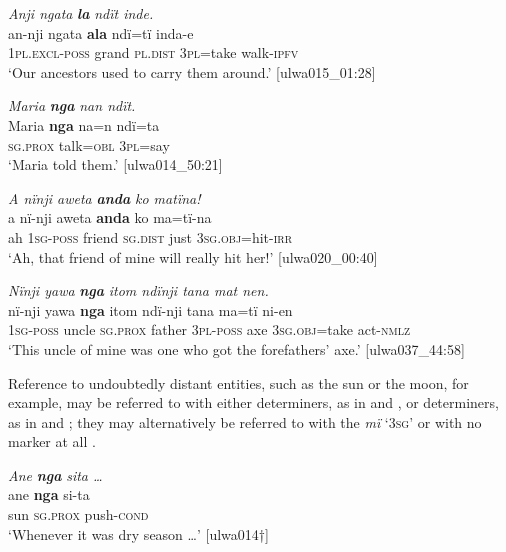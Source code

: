 \ea%
    \label{ex:det:114}
          \textit{Anji ngata} \textbf{\textit{la}} \textit{ndït inde.}\\
\gll    an-nji        ngata  \textbf{ala}      ndï=tï    inda-e\\
    1\textsc{pl.excl-poss}  grand  \textsc{pl.dist}  3\textsc{pl}=take  walk-\textsc{ipfv}\\
\glt `Our ancestors used to carry them around.’ [ulwa015\_01:28]
\z


\ea%
    \label{ex:det:116}
          \textit{Maria} \textbf{\textit{nga}} \textit{nan ndït.}\\
\gll    Maria  \textbf{nga}    na=n    ndï=ta\\
    [name]  \textsc{sg.prox}  talk=\textsc{obl}  3\textsc{pl}=say\\
\glt `Maria told them.’ [ulwa014\_50:21]
\z

\ea%
    \label{ex:det:117}
          \textit{A nïnji aweta} \textbf{\textit{anda}} \textit{ko matïna!}\\
\gll    a  nï-nji    aweta  \textbf{anda}    ko  ma=tï-na\\
    ah  1\textsc{sg-poss}  friend  \textsc{sg.dist}  just  3\textsc{sg.obj}=hit-\textsc{irr}\\
\glt `Ah, that friend of mine will really hit her!’ [ulwa020\_00:40]
\z

\ea%
    \label{ex:det:118}
          \textit{Nïnji yawa} \textbf{\textit{nga}} \textit{itom ndïnji tana mat nen.}\\
\gll    nï-nji    yawa  \textbf{nga}    itom  ndï-nji    tana  ma=tï ni-en\\
    1\textsc{sg-poss}  uncle  \textsc{sg.prox}  father  3\textsc{pl-poss}  axe    3\textsc{sg.obj}=take    act\textsc{{}-nmlz}\\
\glt `This uncle of mine was one who got the forefathers’ axe.’ [ulwa037\_44:58]
\z

Reference to undoubtedly distant entities, such as the sun or the moon, for example, may be referred to with either  determiners, as in  and , or  determiners, as in  and ; they may alternatively be referred to with the  \textit{mï} ‘3\textsc{sg}’  or with no marker at all .

\ea%
    \label{ex:det:119}
          \textit{Ane} \textbf{\textit{nga}} \textit{sita …}\\
\gll    ane  \textbf{nga}    si-ta\\
    sun  \textsc{sg.prox}  push-\textsc{cond}\\
\glt `Whenever it was dry season …’ [ulwa014†]
\z

